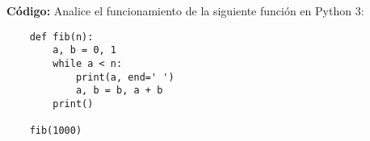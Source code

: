 \pregunta[20]
\textbf{Código:} Analice el funcionamiento de la siguiente función en Python 3:
\begin{verbatim}
    def fib(n):
        a, b = 0, 1
        while a < n:
            print(a, end=' ')
            a, b = b, a + b
        print()

    fib(1000)
    \end{verbatim}
\mostrarpuntaje{}